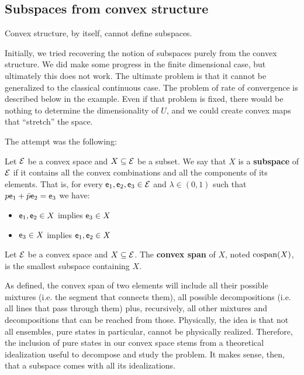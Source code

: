 \subsection{Subspaces from convex structure}

\begin{insight}
	Convex structure, by itself, cannot define subspaces.
\end{insight}

Initially, we tried recovering the notion of subspaces purely from the convex structure. We did make some progress in the finite dimensional case, but ultimately this does not work. The ultimate problem is that it cannot be generalized to the classical continuous case. The problem of rate of convergence is described below in the example. Even if that problem is fixed, there would be nothing to determine the dimensionality of $U$, and we could create convex maps that ``stretch'' the space.

The attempt was the following:

\begin{defn}
	Let $\mathcal{E}$ be a convex space and $X \subseteq \mathcal{E}$ be a subset. We say that $X$ is a \textbf{subspace} of $\mathcal{E}$ if it contains all the convex combinations and all the components of its elements. That is, for every $\mathsf{e}_1, \mathsf{e}_2, \mathsf{e}_3 \in \mathcal{E}$ and $\lambda \in (0,1)$ such that $p \mathsf{e}_1 + \bar{p} \mathsf{e}_2 = \mathsf{e}_3$ we have:
	\begin{itemize}
		\item $\mathsf{e}_1, \mathsf{e}_2 \in X$ implies $\mathsf{e}_3 \in X$
		\item $\mathsf{e}_3 \in X$ implies $\mathsf{e}_1, \mathsf{e}_2 \in X$
	\end{itemize}
\end{defn}

\begin{defn}
	Let $\mathcal{E}$ be a convex space and $X \subseteq \mathcal{E}$.  The \textbf{convex span} of $X$, noted $\mathrm{cospan}(X)$, is the smallest subspace containing $X$.
\end{defn}

\begin{remark}
	As defined, the convex span of two elements will include all their possible mixtures (i.e. the segment that connects them), all possible decompositions (i.e. all lines that pass through them) plus, recursively, all other mixtures and decompositions that can be reached from those. Physically, the idea is that not all ensembles, pure states in particular, cannot be physically realized. Therefore, the inclusion of pure states in our convex space stems from a theoretical idealization useful to decompose and study the problem. It makes sense, then, that a subspace comes with all its idealizations.
\end{remark}

